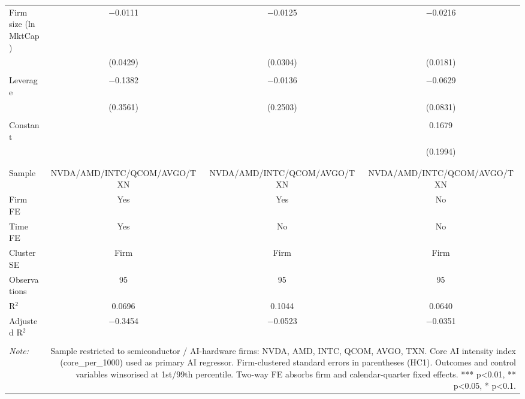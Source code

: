 \begin{table}[!htbp]
\begin{tabular}{@{\extracolsep{5pt}}lccc}
 Firm size (ln MktCap) & $-$0.0111 & $-$0.0125 & $-$0.0216 \\ 
  & (0.0429) & (0.0304) & (0.0181) \\ 
  & & & \\ 
 Leverage & $-$0.1382 & $-$0.0136 & $-$0.0629 \\ 
  & (0.3561) & (0.2503) & (0.0831) \\ 
  & & & \\ 
 Constant &  &  & 0.1679 \\ 
  &  &  & (0.1994) \\ 
  & & & \\ 
\hline \\[-1.8ex] 
Sample & NVDA/AMD/INTC/QCOM/AVGO/TXN & NVDA/AMD/INTC/QCOM/AVGO/TXN & NVDA/AMD/INTC/QCOM/AVGO/TXN \\ 
Firm FE & Yes & Yes & No \\ 
Time FE & Yes & No & No \\ 
Cluster SE & Firm & Firm & Firm \\ 
Observations & 95 & 95 & 95 \\ 
R$^{2}$ & 0.0696 & 0.1044 & 0.0640 \\ 
Adjusted R$^{2}$ & $-$0.3454 & $-$0.0523 & $-$0.0351 \\ 
\hline 
\hline \\[-1.8ex] 
\textit{Note:}  & \multicolumn{3}{r}{Sample restricted to semiconductor / AI-hardware firms: NVDA, AMD, INTC, QCOM, AVGO, TXN. Core AI intensity index (core_per_1000) used as primary AI regressor. Firm-clustered standard errors in parentheses (HC1). Outcomes and control variables winsorised at 1st/99th percentile. Two-way FE absorbs firm and calendar-quarter fixed effects. *** p<0.01, ** p<0.05, * p<0.1.} \\ 
\end{tabular} 
\end{table} 
